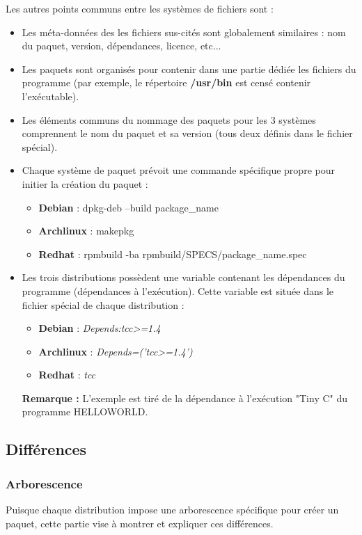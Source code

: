 \documentclass[12pt,a4paper]{article}
\newenvironment{remarque}{\textbf{Remarque :}}{}
\begin{document}
Les autres points communs entre les systèmes de fichiers sont :
\begin{itemize}
	\item Les méta-données des les fichiers sus-cités sont globalement similaires : nom du paquet, version, dépendances, licence, etc...
	\item Les paquets sont organisés pour contenir dans une partie dédiée les fichiers du programme (par exemple, le répertoire \textbf{/usr/bin} est censé contenir l'exécutable).
	\item Les éléments communs du nommage des paquets pour les 3 systèmes comprennent le nom du paquet et sa version (tous deux définis dans le fichier spécial).
	\item Chaque système de paquet prévoit une commande spécifique propre pour initier la création du paquet :
	\begin{itemize}
		\item \textbf{Debian} : dpkg-deb --build package\_name
		\item \textbf{Archlinux} : makepkg
		\item \textbf{Redhat} : rpmbuild -ba rpmbuild/SPECS/package\_name.spec
	\end{itemize}
	\item Les trois distributions possèdent une variable contenant les dépendances du programme (dépendances à l'exécution). Cette variable est située dans le fichier spécial de chaque distribution :
	\begin{itemize}
		\item \textbf{Debian} : \textit{Depends:tcc\textgreater=1.4}
		\item \textbf{Archlinux} : \textit{Depends=('tcc\textgreater=1.4')}
		\item \textbf{Redhat} : \textit{tcc}
	\end{itemize}
	\begin{remarque} L'exemple est tiré de la dépendance à l'exécution "Tiny C" du programme HELLOWORLD.
	\end{remarque}
\end{itemize}

\subsection{Différences}
\subsubsection{Arborescence}
Puisque chaque distribution impose une arborescence spécifique pour créer un paquet, cette partie vise à montrer et expliquer ces différences.
\end{document}
